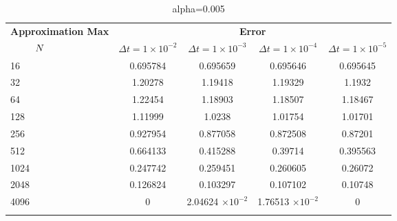	
	\begin{table}
		\begin{tabular}{lcccc}
			\toprule
			\multicolumn{1}{c}{\textbf{Approximation Max}} & \multicolumn{4}{c}{\textbf{Error}} \\
			$\hspace{9mm}N$ & $\Delta t=1\times 10^{-2}$ & $\Delta t=1\times 10^{-3}$ & $\Delta t=1\times 10^{-4}$ & $\Delta t=1\times 10^{-5}$ \\
			\midrule
			\hspace{7mm} 16 & 0.695784 & 0.695659  & 0.695646  & 0.695645 \\
			\midrule
			\hspace{7mm} 32 & 1.20278  & 1.19418   & 1.19329   & 1.1932   \\
			\midrule
			\hspace{7mm} 64 & 1.22454  & 1.18903   & 1.18507   & 1.18467  \\
			\midrule
			\hspace{7mm} 128 & 1.11999  & 1.0238    & 1.01754   & 1.01701  \\
			\midrule
			\hspace{7mm} 256 & 0.927954 & 0.877058  & 0.872508  & 0.87201  \\
			\midrule
			\hspace{7mm} 512 & 0.664133 & 0.415288  & 0.39714   & 0.395563 \\
			\midrule
			\hspace{7mm} 1024 & 0.247742 & 0.259451  & 0.260605  & 0.26072  \\
			\midrule
			\hspace{7mm} 2048 & 0.126824 & 0.103297  & 0.107102  & 0.10748  \\
			\midrule
			\hspace{7mm} 4096 & 0        & 2.04624 $\times 10 ^{-2}$ & 1.76513  $\times 10 ^{-2}$ & 0        \\
			\\
			\bottomrule
		\end{tabular}
		\caption{alpha=0.005}
	\end{table}


    
